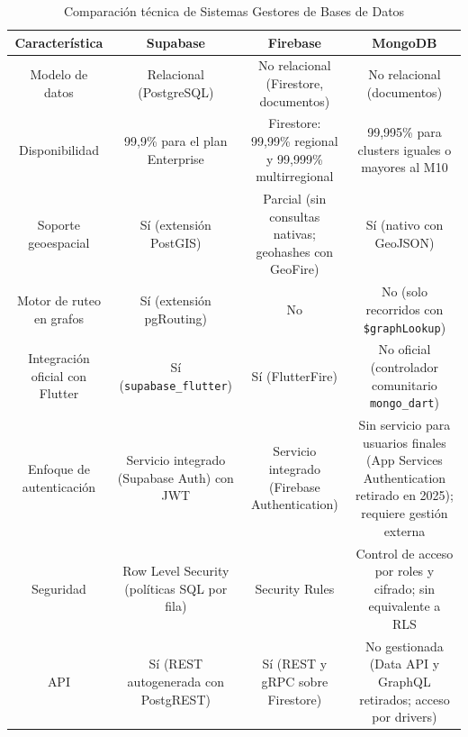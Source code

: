 \begin{table}[htbp]
\centering
\footnotesize
\caption{Comparación técnica de Sistemas Gestores de Bases de Datos}
\label{tab:comparativa-dbms}
\begin{tabularx}{\textwidth}{ |C|C|C|C| }
\hline
\textbf{Característica} & \textbf{Supabase} & \textbf{Firebase} & \textbf{MongoDB} \\ \hline

Modelo de datos &
Relacional (PostgreSQL) \cite{supabase_arquitectura} &
No relacional (Firestore, documentos) \cite{firebase_modelo} &
No relacional (documentos) \cite{mongodb_atlas} \\ \hline

Disponibilidad &
99,9\% para el plan Enterprise \cite{supabase_sla} &
Firestore: 99,99\% regional y 99,999\% multirregional \cite{firebase_sla} &
99,995\% para clusters iguales o mayores al M10 \cite{mongodb_trust} \\ \hline

Soporte geoespacial &
Sí (extensión PostGIS) \cite{supabase_postgis} &
Parcial (sin consultas nativas; geohashes con GeoFire) \cite{firebase_geoqueries} &
Sí (nativo con GeoJSON) \cite{mongodb_geojson} \\ \hline

Motor de ruteo en grafos &
Sí (extensión pgRouting) \cite{supabase_pgrouting} &
No \cite{firebase_geoqueries} &
No (solo recorridos con \texttt{\$graphLookup}) \cite{mongodb_graphlookup} \\ \hline

Integración oficial con Flutter &
Sí (\texttt{supabase\_flutter}) \cite{supabase_flutter} &
Sí (FlutterFire) \cite{firebase_flutter} &
No oficial (controlador comunitario \texttt{mongo\_dart}) \cite{mongo_dart} \\ \hline

Enfoque de autenticación &
Servicio integrado (Supabase Auth) con JWT \cite{supabase_auth} &
Servicio integrado (Firebase Authentication) \cite{firebase_auth} &
Sin servicio para usuarios finales (App Services Authentication retirado en 2025); requiere gestión externa \cite{mongodb_appservices,mongodb_deprecacion} \\ \hline

Seguridad &
Row Level Security (políticas SQL por fila) \cite{supabase_seguridad} &
Security Rules \cite{firebase_reglas} &
Control de acceso por roles y cifrado; sin equivalente a RLS \cite{mongodb_seguridad} \\ \hline

API &
Sí (REST autogenerada con PostgREST) \cite{supabase_arquitectura} &
Sí (REST y gRPC sobre Firestore) \cite{firebase_api} &
No gestionada (Data API y GraphQL retirados; acceso por drivers) \cite{mongodb_deprecacion} \\ \hline
\end{tabularx}
\end{table}

